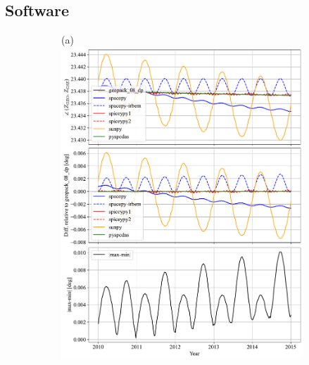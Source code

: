 \documentclass[draft]{agujournal2019}
\begin{document}
\clearpage




\subsection{Software}
\label{sect:comparisons_software}
\vspace{-1.5in}
\begin{figure}[htb]
     \begin{subfigure}[b]{0.49\textwidth}
         (a)
         \centering
         \includegraphics[width=\textwidth]{code/figures/angles/delta=1days_20100101-20150101/GEO_GSE.pdf}

\end{subfigure}
\end{figure}
\end{document}
